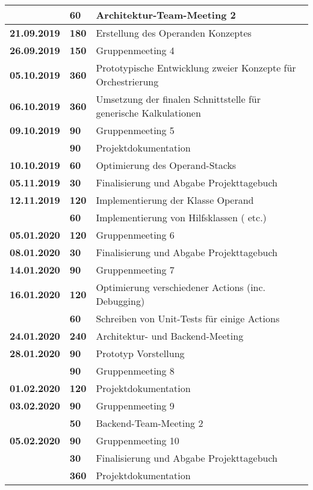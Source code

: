 {{\begin{longtable}{|l|l|p{11cm}|}
			& \textbf{\hfill 60} & Architektur-Team-Meeting 2
		\\ \hline \textbf{21.09.2019}
			& \textbf{\hfill 180} & Erstellung des Operanden Konzeptes
		\\ \hline \textbf{26.09.2019}
			& \textbf{\hfill 150} & Gruppenmeeting 4
		\\ \hline \textbf{05.10.2019}
			& \textbf{\hfill 360} & Prototypische Entwicklung zweier Konzepte für Orchestrierung
		\\ \hline \textbf{06.10.2019}
			& \textbf{\hfill 360} & Umsetzung der finalen Schnittstelle für generische Kalkulationen
		\\ \hline \textbf{09.10.2019}
			& \textbf{\hfill 90} & Gruppenmeeting 5 \\\cline{2-3}
			& \textbf{\hfill 90} & Projektdokumentation
		\\ \hline \textbf{10.10.2019}
			& \textbf{\hfill 60} & Optimierung des Operand-Stacks
		\\ \hline \textbf{05.11.2019}
			& \textbf{\hfill 30} & Finalisierung und Abgabe Projekttagebuch
		\\ \hline \textbf{12.11.2019}
		& \textbf{\hfill 120} & Implementierung der Klasse Operand \\\cline{2-3}
		& \textbf{\hfill 60} & Implementierung von Hilfsklassen (\code{DoubleComparator} etc.)
		\\ \hline \textbf{05.01.2020}
			& \textbf{\hfill 120} & Gruppenmeeting 6
		\\ \hline \textbf{08.01.2020}
			& \textbf{\hfill 30} & Finalisierung und Abgabe Projekttagebuch
		\\ \hline \textbf{14.01.2020}
			& \textbf{\hfill 90} & Gruppenmeeting 7
		\\ \hline \textbf{16.01.2020}
			& \textbf{\hfill 120} & Optimierung verschiedener Actions (inc. Debugging) \\\cline{2-3}
			& \textbf{\hfill 60} & Schreiben von Unit-Tests für einige Actions
		\\ \hline \textbf{24.01.2020}
			& \textbf{\hfill 240} & Architektur- und Backend-Meeting
		\\ \hline \textbf{28.01.2020}
			& \textbf{\hfill 90} & Prototyp Vorstellung \\\cline{2-3}
			& \textbf{\hfill 90} & Gruppenmeeting 8
		\\ \hline \textbf{01.02.2020}
			& \textbf{\hfill 120} & Projektdokumentation
		\\ \hline \textbf{03.02.2020}
			& \textbf{\hfill 90} & Gruppenmeeting 9 \\\cline{2-3}
			& \textbf{\hfill 50} & Backend-Team-Meeting 2
		\\ \hline \textbf{05.02.2020}
			& \textbf{\hfill 90} & Gruppenmeeting 10 \\\cline{2-3}
			& \textbf{\hfill 30} & Finalisierung und Abgabe Projekttagebuch \\\cline{2-3}
			& \textbf{\hfill 360} & Projektdokumentation \\
		\hline\hline
	\end{longtable}
}

}
